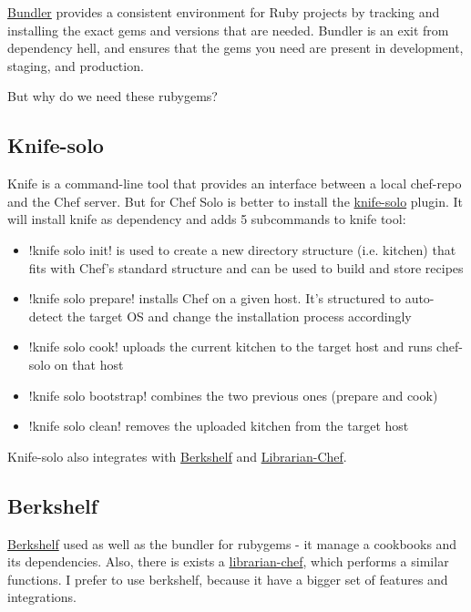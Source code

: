 \href{http://bundler.io/}{Bundler} provides a consistent environment for Ruby projects by tracking and installing the exact gems and versions that are needed. Bundler is an exit from dependency hell, and ensures that the gems you need are present in development, staging, and production.

But why do we need these rubygems?

\subsection{Knife-solo}

Knife is a command-line tool that provides an interface between a local chef-repo and the Chef server. But for Chef Solo is better to install the \href{http://matschaffer.github.io/knife-solo/}{knife-solo} plugin. It will install knife as dependency and adds 5 subcommands to knife tool:

\begin{itemize}
  \item \inline!knife solo init! is used to create a new directory structure (i.e. kitchen) that fits with Chef's standard structure and can be used to build and store recipes
  \item \inline!knife solo prepare! installs Chef on a given host. It's structured to auto-detect the target OS and change the installation process accordingly
  \item \inline!knife solo cook! uploads the current kitchen to the target host and runs chef-solo on that host
  \item \inline!knife solo bootstrap! combines the two previous ones (prepare and cook)
  \item \inline!knife solo clean! removes the uploaded kitchen from the target host
\end{itemize}

Knife-solo also integrates with \href{http://berkshelf.com/}{Berkshelf} and \href{https://github.com/applicationsonline/librarian-chef}{Librarian-Chef}.

\subsection{Berkshelf}

\href{http://berkshelf.com/}{Berkshelf} used as well as the bundler for rubygems - it manage a cookbooks and its dependencies. Also, there is exists a \href{https://github.com/applicationsonline/librarian-chef}{librarian-chef}, which performs a similar functions. I prefer to use berkshelf, because it have a bigger set of features and integrations.
